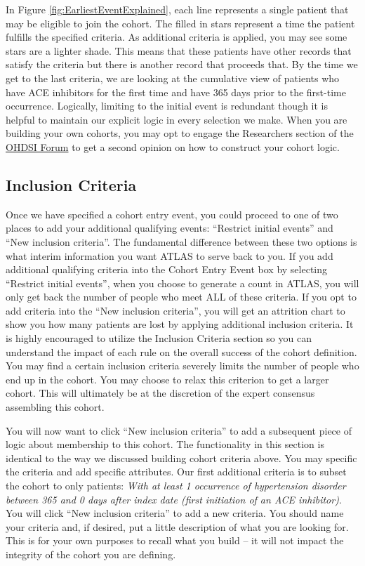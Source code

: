 \documentclass[11pt]{book}
\theoremstyle{definition}
\theoremstyle{definition}
\theoremstyle{definition}
\theoremstyle{remark}
\begin{document}
In Figure \ref{fig:EarliestEventExplained}, each line represents a
single patient that may be eligible to join the cohort. The filled in
stars represent a time the patient fulfills the specified criteria. As
additional criteria is applied, you may see some stars are a lighter
shade. This means that these patients have other records that satisfy
the criteria but there is another record that proceeds that. By the time
we get to the last criteria, we are looking at the cumulative view of
patients who have ACE inhibitors for the first time and have 365 days
prior to the first-time occurrence. Logically, limiting to the initial
event is redundant though it is helpful to maintain our explicit logic
in every selection we make. When you are building your own cohorts, you
may opt to engage the Researchers section of the
\href{http://forums.ohdsi.org}{OHDSI Forum} to get a second opinion on
how to construct your cohort logic.

\subsection{Inclusion Criteria}\label{inclusion-criteria}

Once we have specified a cohort entry event, you could proceed to one of
two places to add your additional qualifying events: ``Restrict initial
events'' and ``New inclusion criteria''. The fundamental difference
between these two options is what interim information you want ATLAS to
serve back to you. If you add additional qualifying criteria into the
Cohort Entry Event box by selecting ``Restrict initial events'', when
you choose to generate a count in ATLAS, you will only get back the
number of people who meet ALL of these criteria. If you opt to add
criteria into the ``New inclusion criteria'', you will get an attrition
chart to show you how many patients are lost by applying additional
inclusion criteria. It is highly encouraged to utilize the Inclusion
Criteria section so you can understand the impact of each rule on the
overall success of the cohort definition. You may find a certain
inclusion criteria severely limits the number of people who end up in
the cohort. You may choose to relax this criterion to get a larger
cohort. This will ultimately be at the discretion of the expert
consensus assembling this cohort.

You will now want to click ``New inclusion criteria'' to add a
subsequent piece of logic about membership to this cohort. The
functionality in this section is identical to the way we discussed
building cohort criteria above. You may specific the criteria and add
specific attributes. Our first additional criteria is to subset the
cohort to only patients: \emph{With at least 1 occurrence of
hypertension disorder between 365 and 0 days after index date (first
initiation of an ACE inhibitor)}. You will click ``New inclusion
criteria'' to add a new criteria. You should name your criteria and, if
desired, put a little description of what you are looking for. This is
for your own purposes to recall what you build -- it will not impact the
integrity of the cohort you are defining.
\end{document}
